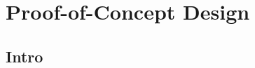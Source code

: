 \documentclass[aspectratio=169]{beamer}
\begin{document}
\section{Proof-of-Concept Design}
\frame{\sectionpage}
\subsection{Intro}

\end{document}
